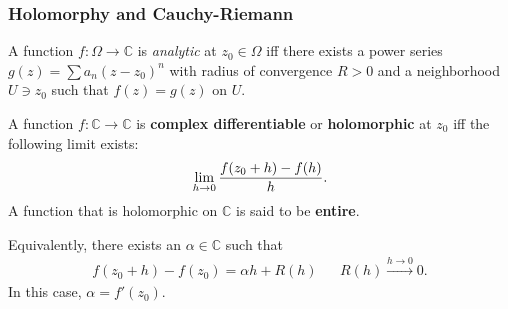 \hypertarget{holomorphy-and-cauchy-riemann}{%
\subsubsection{Holomorphy and
Cauchy-Riemann}\label{holomorphy-and-cauchy-riemann}}

\begin{definition}[Analytic]

A function \(f:\Omega \to {\mathbb{C}}\) is \emph{analytic} at
\(z_0\in \Omega\) iff there exists a power series
\(g(z) = \sum a_n (z-z_0)^n\) with radius of convergence \(R>0\) and a
neighborhood \(U\ni z_0\) such that \(f(z) = g(z)\) on \(U\).

\end{definition}

\begin{definition}

A function \(f: {\mathbb{C}}\to {\mathbb{C}}\) is \textbf{complex
differentiable} or \textbf{holomorphic} at \(z_0\) iff the following
limit exists:
\begin{align*}
\lim_{h\to 0} { f(z_0 + h) - f(h) \over h  } 
.\end{align*}
A function that is holomorphic on \({\mathbb{C}}\) is said to be
\textbf{entire}.

Equivalently, there exists an \(\alpha\in {\mathbb{C}}\) such that
\begin{align*}
f(z_0+h) - f(z_0) = \alpha h + R(h) && R(h) \overset{h\to 0}\longrightarrow 0 
.\end{align*}
In this case, \(\alpha = f'(z_0)\).

\end{definition}

